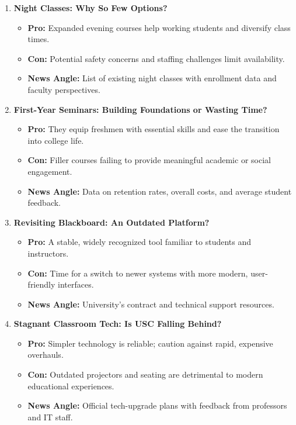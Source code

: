 \documentclass{article}
\begin{document}
\begin{enumerate}[leftmargin=*]
    \item \textbf{Night Classes: Why So Few Options?}
    \begin{itemize}
        \item \textbf{Pro:} Expanded evening courses help working students and diversify class times.
        \item \textbf{Con:} Potential safety concerns and staffing challenges limit availability.
        \item \textbf{News Angle:} List of existing night classes with enrollment data and faculty perspectives.
    \end{itemize}

    \item \textbf{First-Year Seminars: Building Foundations or Wasting Time?}
    \begin{itemize}
        \item \textbf{Pro:} They equip freshmen with essential skills and ease the transition into college life.
        \item \textbf{Con:} Filler courses failing to provide meaningful academic or social engagement.
        \item \textbf{News Angle:} Data on retention rates, overall costs, and average student feedback.
    \end{itemize}

    \item \textbf{Revisiting Blackboard: An Outdated Platform?}
    \begin{itemize}
        \item \textbf{Pro:} A stable, widely recognized tool familiar to students and instructors.
        \item \textbf{Con:} Time for a switch to newer systems with more modern, user-friendly interfaces.
        \item \textbf{News Angle:} University's contract and technical support resources.
    \end{itemize}

    \item \textbf{Stagnant Classroom Tech: Is USC Falling Behind?}
    \begin{itemize}
        \item \textbf{Pro:} Simpler technology is reliable; caution against rapid, expensive overhauls.
        \item \textbf{Con:} Outdated projectors and seating are detrimental to modern educational experiences.
        \item \textbf{News Angle:} Official tech-upgrade plans with feedback from professors and IT staff.
    \end{itemize}


\end{enumerate}
\end{document}
